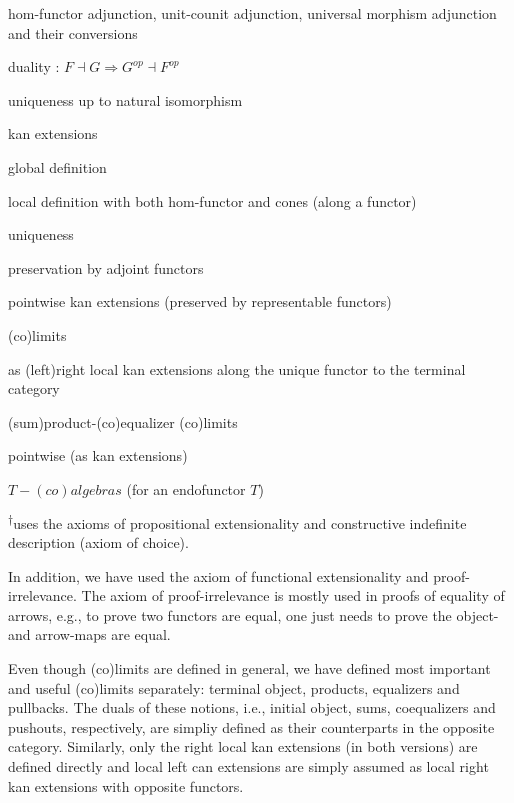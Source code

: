 \documentclass[9pt, twocolumn]{extarticle}
\renewenvironment{itemize}[1]{\begin{compactitem}#1}{\end{compactitem}}
\begin{document}
\begin{itemize}[\tiny$\blacksquare$]
	\begin{itemize}
	\item hom-functor adjunction, unit-counit adjunction, universal morphism adjunction and their conversions
	\item duality : $F \dashv G \Rightarrow G^{op} \dashv F^{op}$
	\item uniqueness up to natural isomorphism
	\end{itemize}
\item kan extensions
	\begin{itemize}
	\item global definition
	\item local definition with both hom-functor and cones (along a functor)
	\item uniqueness
	\item preservation by adjoint functors
	\item pointwise kan extensions (preserved by representable functors)
	\end{itemize}
\item (co)limits
	\begin{itemize}
	\item as (left)right local kan extensions along the unique functor to the terminal category
	\item (sum)product-(co)equalizer (co)limits
	\item pointwise (as kan extensions)
	\end{itemize}
\item $T-(co)algebras$ (for an endofunctor $T$)
\item[] \textsuperscript{$\dagger$}uses the axioms of propositional extensionality and constructive indefinite description (axiom of choice).
\end{itemize}

In addition, we have used the axiom of functional extensionality and proof-irrelevance.
The axiom of proof-irrelevance is mostly used in proofs of equality of arrows, e.g., to prove two functors are equal, one just needs to prove the object- and arrow-maps are equal.

Even though (co)limits are defined in general, we have defined most important and useful (co)limits separately: terminal object, products, equalizers and pullbacks.
The duals of these notions, i.e., initial object, sums, coequalizers and pushouts, respectively, are simpliy defined as their counterparts in the opposite category.
Similarly, only the right local kan extensions (in both versions) are defined directly and local left can extensions are simply assumed as local right kan extensions with opposite functors.
\end{document}
